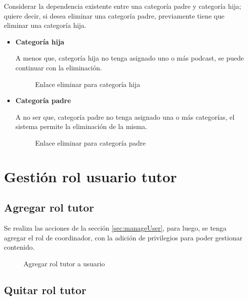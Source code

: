 Considerar la dependencia existente entre una categoría padre y categoría hija;
quiere decir, si desea eliminar una categoría padre, previamente tiene que
eliminar una categoría hija.

\begin{itemize}

\item \textbf{Categoría hija}

A menos que, categoría hija no tenga asignado uno o más podcast, se puede
continuar con la eliminación.

\begin{figure}[!ht]
\centering
		\caption{Enlace eliminar para categoría hija}
\end{figure}

\item \textbf{Categoría padre}

A no ser que, categoría padre no tenga asignado una o más categorías, el sistema
permite la eliminación de la misma.

\begin{figure}[!ht]
\centering
		\caption{Enlace eliminar para categoría padre}
\end{figure}

\end{itemize}

\section{Gestión rol usuario tutor}

\subsection{Agregar rol tutor}

Se realiza las acciones de la sección \ref{sec:manageUser}, para luego, se
tenga agregar el rol de coordinador, con la adición de privilegios para poder
gestionar contenido.

\begin{figure}[!ht]
\centering
		\caption{Agregar rol tutor a usuario}
\end{figure}

\subsection{Quitar rol tutor}

